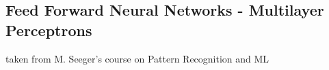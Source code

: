\subsection*{Feed Forward Neural Networks - Multilayer Perceptrons}
taken from M. Seeger's course on Pattern Recognition and ML


